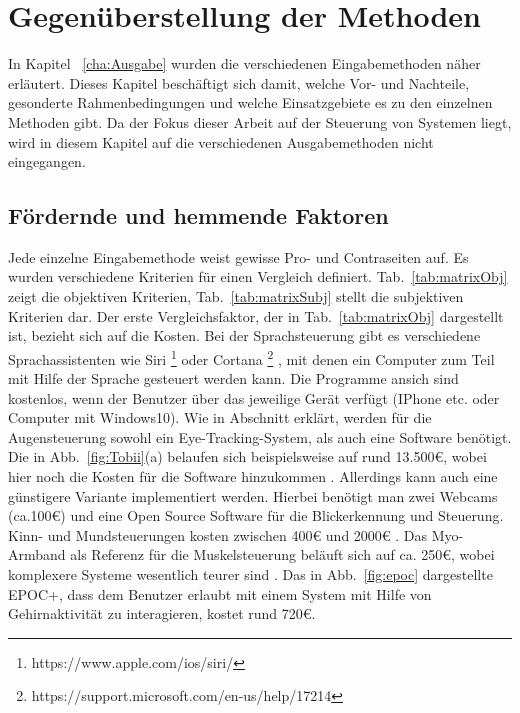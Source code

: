 \chapter{Gegenüberstellung der Methoden}
\label{cha:Vergleich}

In Kapitel ~\ref{cha:Ausgabe} wurden die verschiedenen Eingabemethoden näher erläutert. Dieses Kapitel beschäftigt sich damit, welche Vor- und Nachteile, gesonderte Rahmenbedingungen und welche Einsatzgebiete es zu den einzelnen Methoden gibt. Da der Fokus dieser Arbeit auf der Steuerung von Systemen liegt, wird in diesem Kapitel auf die verschiedenen Ausgabemethoden nicht eingegangen.

\section{Fördernde und hemmende Faktoren}
%
Jede einzelne Eingabemethode weist gewisse Pro- und Contraseiten auf. Es wurden verschiedene Kriterien für einen Vergleich definiert. Tab.~\ref{tab:matrixObj} zeigt die objektiven Kriterien, Tab.~\ref{tab:matrixSubj} stellt die subjektiven Kriterien dar.
\newline \newline
Der erste Vergleichsfaktor, der in Tab.~\ref{tab:matrixObj} dargestellt ist, bezieht sich auf die Kosten. Bei der Sprachsteuerung gibt es verschiedene Sprachassistenten wie \zB Siri%
\footnote{https://www.apple.com/ios/siri/}
%
 oder Cortana%
\footnote{https://support.microsoft.com/en-us/help/17214}
%
 , mit denen ein Computer zum Teil mit Hilfe der Sprache gesteuert werden kann. Die Programme ansich sind kostenlos, wenn der Benutzer über das jeweilige Gerät verfügt (IPhone etc. oder Computer mit Windows10).
Wie in Abschnitt \label{cha:Augensteuerung} erklärt, werden für die Augensteuerung sowohl ein Eye-Tracking-System, als auch eine Software benötigt. Die in Abb.~\ref{fig:Tobii}(a) belaufen sich beispielsweise auf rund 13.500€, wobei hier noch die Kosten für die Software hinzukommen \cite{TobiiCosts}. Allerdings kann auch eine günstigere Variante implementiert werden. Hierbei benötigt man zwei Webcams (ca.100€) und eine Open Source Software für die Blickerkennung und Steuerung. Kinn- und Mundsteuerungen kosten zwischen 400€ und 2000€ \cite{SENSORY} \cite{INTEGRA}. Das Myo-Armband als Referenz für die Muskelsteuerung beläuft sich auf ca. 250€, wobei komplexere Systeme wesentlich teurer sind \cite{myoBand}. Das in Abb.~\ref{fig:epoc} dargestellte EPOC+, dass dem Benutzer erlaubt mit einem System mit Hilfe von Gehirnaktivität zu interagieren, kostet rund 720€.
